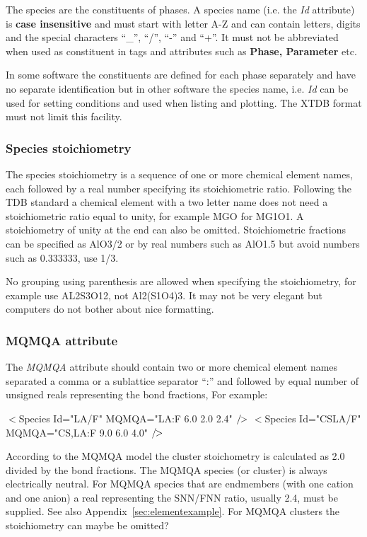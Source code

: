 \documentclass{article}
\newcommand\eoxml{/\hspace{-4pt}>}
\begin{document}
The species are the constituents of phases.  A species name (i.e. the
{\em Id} attribute) is {\bf case insensitive} and must start with
letter A-Z and can contain letters, digits and the special characters
``\_'', ``/'', ``-'' and ``+''.  It must not be abbreviated when used
as constituent in tags and attributes such as {\bf Phase, Parameter}
etc. 

In some software the constituents are defined for each phase
separately and have no separate identification but in other software
the species name, i.e. {\em Id} can be used for setting conditions and
used when listing and plotting.  The XTDB format must not limit this
facility.

\subsubsection{Species stoichiometry}\label{sec:speciesSS}

The species stoichiometry is a sequence of one or more chemical
element names, each followed by a real number specifying its
stoichiometric ratio.  Following the TDB standard a chemical element
with a two letter name does not need a stoichiometric ratio equal to
unity, for example MGO for MG1O1.  A stoichiometry of unity at the end
can also be omitted.  Stoichiometric fractions can be specified as
AlO3/2 or by real numbers such as AlO1.5 but avoid numbers such as
0.333333, use 1/3.

No grouping using parenthesis are allowed when specifying the
stoichiometry, for example use AL2S3O12, not Al2(S1O4)3.  It may not
be very elegant but computers do not bother about nice formatting.

\subsubsection{MQMQA attribute}\label{sec:mqmqa}
The {\em MQMQA} attribute should contain two or more chemical element
names separated a comma or a sublattice separator ``:'' and followed
by equal number of unsigned reals representing the bond fractions, For
example:

  $<$Species Id="LA/F"    MQMQA="LA:F     6.0 2.0 2.4" $\eoxml$
  $<$Species Id="CSLA/F"  MQMQA="CS,LA:F  9.0 6.0 4.0" $\eoxml$

According to the MQMQA model the cluster stoichometry is calculated as
2.0 divided by the bond fractions.  The MQMQA species (or cluster) is
always electrically neutral.  For MQMQA species that are endmembers
(with one cation and one anion) a real representing the SNN/FNN ratio,
usually 2.4, must be supplied.  See also
Appendix~\ref{sec:elementexample}.  For MQMQA clusters the
stoichiometry can maybe be omitted?
\end{document}
